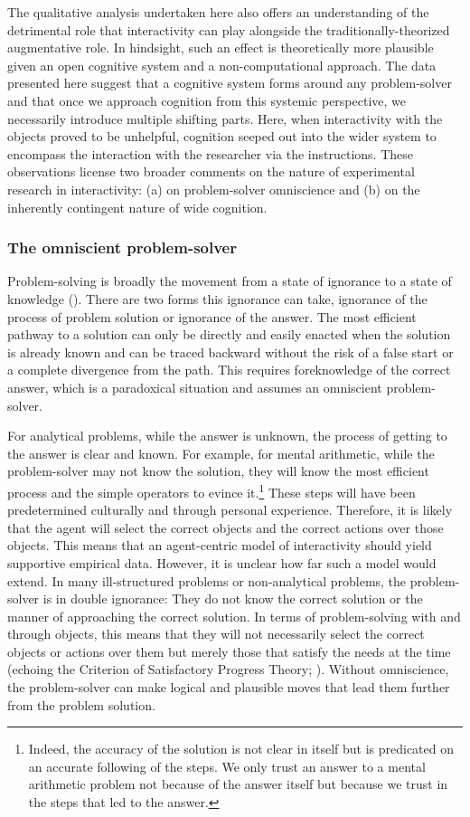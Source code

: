 \documentclass[twocolumn, issue, empirical, authordate,drafn]{jote-new-article}
\begin{document}
The qualitative analysis undertaken here also offers an understanding of the detrimental role that interactivity can play alongside the traditionally-theorized augmentative role. In hindsight, such an effect is theoretically more plausible given an open cognitive system and a non-computational approach. The data presented here suggest that a cognitive system forms around any problem-solver and that once we approach cognition from this systemic perspective, we necessarily introduce multiple shifting parts. Here, when interactivity with the objects proved to be unhelpful, cognition seeped out into the wider system to encompass the interaction with the researcher via the instructions. These observations license two broader comments on the nature of experimental research in interactivity: (a) on problem-solver omniscience and (b) on the inherently contingent nature of wide cognition. 


\subsubsection{The omniscient problem-solver}
Problem-solving is broadly the movement from a state of ignorance to a state of knowledge (). There are two forms this ignorance can take, ignorance of the process of problem solution or ignorance of the answer. The most efficient pathway to a solution can only be directly and easily enacted when the solution is already known and can be traced backward without the risk of a false start or a complete divergence from the path. This requires foreknowledge of the correct answer, which is a paradoxical situation and assumes an omniscient problem-solver. 

For analytical problems, while the answer is unknown, the process of getting to the answer is clear and known. For example, for mental arithmetic, while the problem-solver may not know the solution, they will know the most efficient process and the simple operators to evince it.\footnote{Indeed, the accuracy of the solution is not clear in itself but is predicated on an accurate following of the steps. We only trust an answer to a mental arithmetic problem not because of the answer itself but because we trust in the steps that led to the answer.} These steps will have been predetermined culturally and through personal experience. Therefore, it is likely that the agent will select the correct objects and the correct actions over those objects. This means that an agent-centric model of interactivity should yield supportive empirical data. However, it is unclear how far such a model would extend. In many ill-structured problems or non-analytical problems, the problem-solver is in double ignorance: They do not know the correct solution or the manner of approaching the correct solution. In terms of problem-solving with and through objects, this means that they will not necessarily select the correct objects or actions over them but merely those that satisfy the needs at the time (echoing the Criterion of Satisfactory Progress Theory; ). Without omniscience, the problem-solver can make logical and plausible moves that lead them further from the problem solution. 
\end{document}
